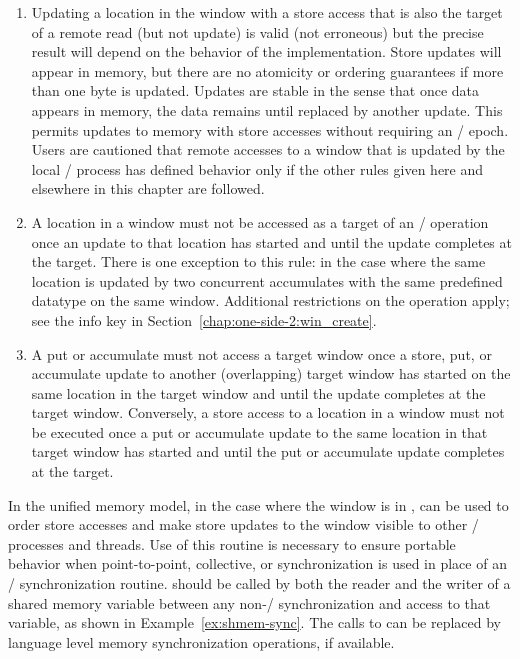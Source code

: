 \begin{enumerate}
\item\label{rule:u3}
Updating a location in the
window with a store access
  that is also the target of a remote read (but not update) is valid
  (not erroneous) but the precise result will depend on the behavior
  of the implementation.  Store
  updates will appear in
  memory, but there are no atomicity or ordering guarantees if
  more than one byte is updated.  Updates are stable in the sense that
  once data appears in memory, the data remains until replaced by
  another update. This permits
  updates to memory
  with store accesses
  without requiring an \RMA/ epoch.  Users are cautioned that remote accesses to
  a window that is updated by the local \mpi/ process has defined
  behavior only if the other rules given here and
  elsewhere in this chapter
  are followed.
\item\label{rule:u4}
A location in a window must not be accessed as a
target of an \RMA/ 
operation once an update to that location has started and until the
update completes at the target. There is one
exception to this rule: in the case where the same location is updated
by two concurrent accumulates with the same
predefined datatype on the same window. Additional restrictions on the
operation apply; see the info key  in
Section~\ref{chap:one-side-2:win_create}.
\item\label{rule:u5}
A put or accumulate must not access a target
window once a store, put, or
accumulate update to another (overlapping) target window
has started on the same location in the target window and until the update
completes at the target window.
Conversely, a store access
to a location in a window must not be executed once a put or
accumulate update to the same location in that target window has started
and until the put or accumulate
update completes at the target.  
\end{enumerate}

\begin{users}\label{atou:unified_memory_model}
In the unified memory model, in the case where
the window is in ,  can be used to order
store accesses and make store updates to the window visible to
other \mpi/ processes and threads. Use of this routine is necessary to
ensure portable behavior when point-to-point, collective, or
 synchronization is used in place of an \RMA/
synchronization routine.  should be called by
both the reader and the writer of a shared memory variable
between any non-\RMA/ synchronization and access to that variable,
as shown in Example~\ref{ex:shmem-sync}.
The calls to  can be replaced by language
level memory synchronization operations, if available.
\end{users}

